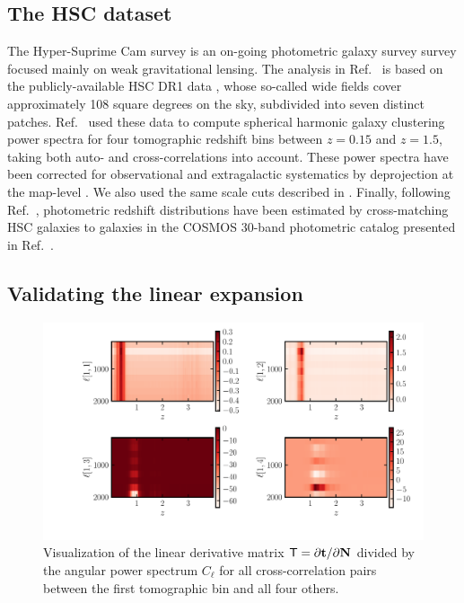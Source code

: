 \documentclass[a4paper,11pt]{article}
\newcommand{\vt}{\mathbf{t}}
\newcommand{\vN}{\mathbf{N}}
\begin{document}
    \subsection{The HSC dataset}\label{ssec:hsc.data}
      The Hyper-Suprime Cam survey is an on-going photometric galaxy survey survey focused mainly on weak gravitational lensing. The analysis in Ref.~\cite{1912.08209} is based on the publicly-available HSC DR1 data \cite{2018PASJ...70S...8A}, whose so-called wide fields cover approximately 108 square degrees on the sky, subdivided into seven distinct patches. Ref.~\cite{1912.08209} used these data to compute spherical harmonic galaxy clustering power spectra for four tomographic redshift bins between $z=0.15$ and $z=1.5$, taking both auto- and cross-correlations into account. These power spectra have been corrected for observational and extragalactic systematics by deprojection at the map-level \cite{2019MNRAS.484.4127A}. We also used the same scale cuts described in \cite{1912.08209}. Finally, following Ref.~\cite{2019PASJ...71...43H}, photometric redshift distributions have been estimated by cross-matching HSC galaxies to galaxies in the COSMOS 30-band photometric catalog presented in Ref.~\cite{2016ApJS..224...24L}.

    \subsection{Validating the linear expansion}\label{ssec:hsc.lin}
      \begin{figure}[ht]
        \centering
        \includegraphics[width=1.\textwidth]{./Tmat}
        \caption{Visualization of the linear derivative matrix ${\sf T} = {\partial \vt}/{\partial \vN}$ divided by the angular power spectrum $C_{\ell}$ for all cross-correlation pairs between the first tomographic bin and all four others.} \label{fig:Tmat}
      \end{figure}
\end{document}
